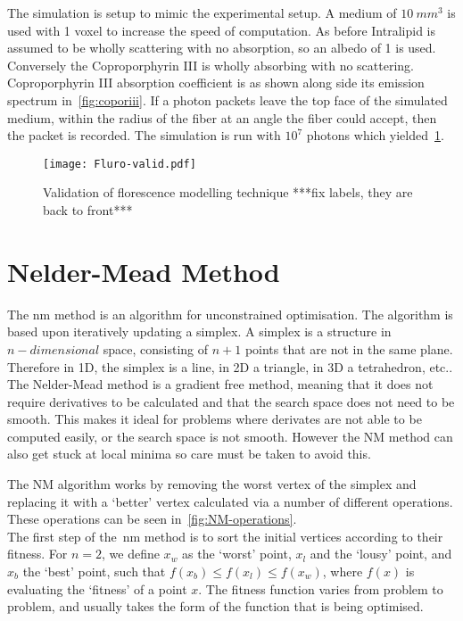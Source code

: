 The simulation is setup to mimic the experimental setup.
A medium of $10~mm^3$ is used with 1 voxel to increase the speed of computation.
As before Intralipid is assumed to be wholly scattering with no absorption, so an albedo of 1 is used.
Conversely the Coproporphyrin III is wholly absorbing with no scattering.
Coproporphyrin III absorption coefficient is as shown along side its emission spectrum in~\cref{fig:coporiii}.
If a photon packets leave the top face of the simulated medium, within the radius of the fiber at an angle the fiber could accept, then the packet is recorded.
The simulation is run with $10^7$ photons which yielded~\cref{fig:flurovalid}.

\begin{figure}[!htpb]
  \centering
  \texttt{[image: Fluro-valid.pdf]}
  \caption{Validation of florescence modelling technique ***fix labels, they are back to front***}
  \label{fig:flurovalid}
\end{figure}

\FloatBarrier

\section{Nelder-Mead Method}

The \gls*{nm} method is an algorithm for unconstrained optimisation. 
The algorithm is based upon iteratively updating a simplex. 
A simplex is a structure in $n-dimensional$ space, consisting of $n+1$ points that are not in the same plane. 
Therefore in 1D, the simplex is a line, in 2D a triangle, in 3D a tetrahedron, etc.. 
The Nelder-Mead method is a gradient free method, meaning that it does not require derivatives to be calculated and that the search space does not need to be smooth.
This makes it ideal for problems where derivates are not able to be computed easily, or the search space is not smooth.
However the NM method can also get stuck at local minima so care must be taken to avoid this.

The NM algorithm works by removing the worst vertex of the simplex and replacing it with a `better' vertex calculated via a number of different operations.
These operations can be seen in~\cref{fig:NM-operations}.\\

The first step of the~\gls*{nm} method is to sort the initial vertices according to their fitness.
For $n=2$, we define $x_w$ as the `worst' point, $x_l$ and the `lousy' point, and $x_b$ the `best' point, such that $f(x_b)\leq f(x_l)\leq f(x_w)$, where $f(x)$ is evaluating the `fitness' of a point $x$. 
The fitness function varies from problem to problem, and usually takes the form of the function that is being optimised.

